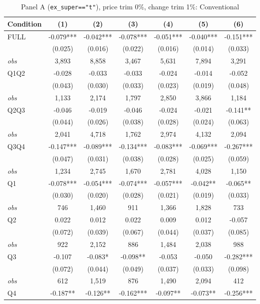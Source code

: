 \begin{table}[!htbp]
\centering
\caption{Panel A (\texttt{ex\_super=="t"}), price trim 0\%, change trim 1\%: Conventional}
\label{tab:a:trim01:conventional}
\small
\begin{tabular}{lcccccc}
\toprule
Condition & (1) & (2) & (3) & (4) & (5) & (6) \\
\midrule
FULL & -0.079*** & -0.042*** & -0.078*** & -0.051*** & -0.040*** & -0.151*** \\
 & (0.025) & (0.016) & (0.022) & (0.016) & (0.014) & (0.033) \\
\textit{obs} & 3,893 & 8,858 & 3,467 & 5,631 & 7,894 & 3,291 \\
Q1Q2 & -0.028 & -0.033 & -0.033 & -0.024 & -0.014 & -0.052 \\
 & (0.043) & (0.030) & (0.033) & (0.023) & (0.019) & (0.048) \\
\textit{obs} & 1,133 & 2,174 & 1,797 & 2,850 & 3,866 & 1,184 \\
Q2Q3 & -0.046 & -0.019 & -0.046 & -0.024 & -0.021 & -0.141** \\
 & (0.044) & (0.026) & (0.038) & (0.028) & (0.024) & (0.063) \\
\textit{obs} & 2,041 & 4,718 & 1,762 & 2,974 & 4,132 & 2,094 \\
Q3Q4 & -0.147*** & -0.089*** & -0.134*** & -0.083*** & -0.069*** & -0.267*** \\
 & (0.047) & (0.031) & (0.038) & (0.028) & (0.025) & (0.059) \\
\textit{obs} & 1,234 & 2,745 & 1,670 & 2,781 & 4,028 & 1,150 \\
Q1 & -0.078*** & -0.054*** & -0.074*** & -0.057*** & -0.042** & -0.065** \\
 & (0.030) & (0.020) & (0.028) & (0.021) & (0.019) & (0.033) \\
\textit{obs} &   746 & 1,460 &   911 & 1,366 & 1,828 &   733 \\
Q2 & 0.022 & 0.012 & 0.022 & 0.009 & 0.012 & -0.057 \\
 & (0.072) & (0.039) & (0.067) & (0.044) & (0.037) & (0.085) \\
\textit{obs} &   922 & 2,152 &   886 & 1,484 & 2,038 &   988 \\
Q3 & -0.107 & -0.083* & -0.098** & -0.053 & -0.050 & -0.282*** \\
 & (0.072) & (0.044) & (0.049) & (0.037) & (0.033) & (0.098) \\
\textit{obs} &   612 & 1,519 &   876 & 1,490 & 2,094 &   412 \\
Q4 & -0.187** & -0.126** & -0.162*** & -0.097** & -0.073** & -0.256*** \\

\end{tabular}
\end{table}
